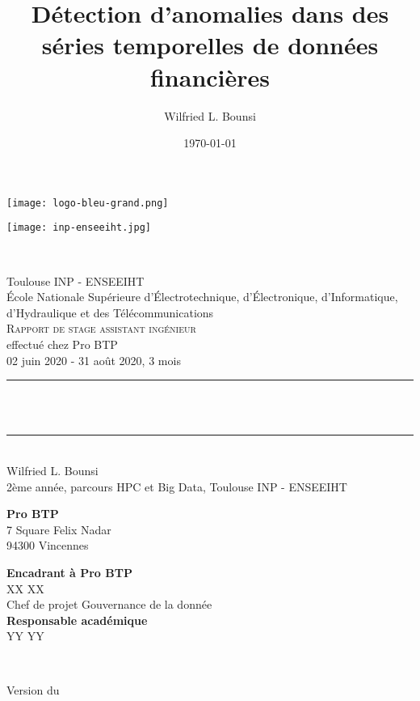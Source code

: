 \documentclass[a4paper]{report}
\title{
Détection d'anomalies dans des séries temporelles de données financières}
\author{Wilfried L. Bounsi}
\date{\today}
\makeatletter
\let\thetitle\@title
\let\thedate\@date
\makeatother
\begin{document}
\begin{titlepage}
	\begin{minipage}{0.5\textwidth}
		\begin{flushleft} \texttt{[image: logo-bleu-grand.png]}
			\end{flushleft}
			\end{minipage}
			\begin{minipage}{0.5\textwidth}
            
			\begin{flushright} \texttt{[image: inp-enseeiht.jpg]}
		\end{flushright}
        
	\end{minipage}\\[.5 cm]
	    
    \begin{center}
        {\Large Toulouse INP - ENSEEIHT\\[.5 cm]
        École Nationale Supérieure d'Électrotechnique, d'Électronique, d'Informatique, d'Hydraulique et des Télécommunications}\\[1.5 cm]
        \textsc{\LARGE Rapport de stage assistant ingénieur}
    \\[.5 cm]
    \large effectué chez Pro BTP\\[.2 cm]
    02 juin 2020 - 31 août 2020, 3 mois\\[1 cm]
	\rule{\linewidth}{0.2 mm} \\[1 cm]
	{ \huge \bfseries \thetitle}\\[.7 cm]
	\rule{\linewidth}{0.2 mm} \\[1 cm]
    	{\Large Wilfried L. Bounsi}\\[.2 cm]
    	{\large 2ème année, parcours HPC et Big Data, Toulouse INP - ENSEEIHT}\\[1 cm]
    \end{center}
	\begin{minipage}{0.5\textwidth}
		\begin{flushleft} \large
		    \textbf{Pro BTP}\\
		    7 Square Felix Nadar\\
            94300 Vincennes\\
		\end{flushleft}
	\end{minipage}
	\begin{minipage}{0.5\textwidth}
        \begin{flushright} \large
			\textbf{Encadrant à Pro BTP} \\
			XX XX\\
            Chef de projet Gouvernance de la donnée \\
            \textbf{Responsable académique} \\
			YY YY\\
		\end{flushright}
	\end{minipage}\\[2 cm]
	\begin{center} Version du \thedate
	\end{center}
\end{titlepage}
\end{document}
